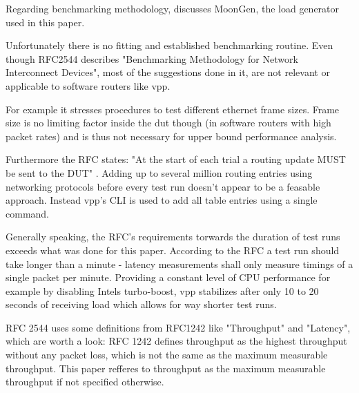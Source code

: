 
Regarding benchmarking methodology, \cite{emmerich2015moongen}
discusses MoonGen, the load generator used in this paper.


Unfortunately there is no fitting and established benchmarking
routine. Even though RFC2544 \cite{rfc2544} describes "Benchmarking
Methodology for Network Interconnect Devices", most of the suggestions
done in it, are not relevant or applicable to software routers like
\Ac{vpp}.


For example it stresses procedures to test different ethernet frame
sizes. Frame size is no limiting factor inside the \Ac{dut} though (in
software routers with high packet rates) and is thus not necessary for
upper bound performance analysis. \cite{emmerich2015assessing}


Furthermore the RFC states: "At the start of each trial a routing
update MUST be sent to the DUT" \cite{rfc2544}. Adding up to several
million routing entries using networking protocols before every test
run doesn't appear to be a feasable approach. Instead \Ac{vpp}'s CLI
is used to add all table entries using a single command.


Generally speaking, the RFC's requirements torwards the duration of
test runs exceeds what was done for this paper. According to the RFC a
test run should take longer than a minute - latency measurements shall
only measure timings of a single packet per minute. Providing a
constant level of CPU performance for example by disabling Intels
turbo-boost, \Ac{vpp} stabilizes after only 10 to 20 seconds of
receiving load which allows for way shorter test runs.


RFC 2544 uses some definitions from RFC1242 \cite{rfc1242} like
"Throughput" and "Latency", which are worth a look: RFC 1242 defines
throughput as the highest throughput without any packet loss, which is
not the same as the maximum measurable throughput. This paper
refferes to throughput as the maximum measurable throughput if
not specified otherwise. 

